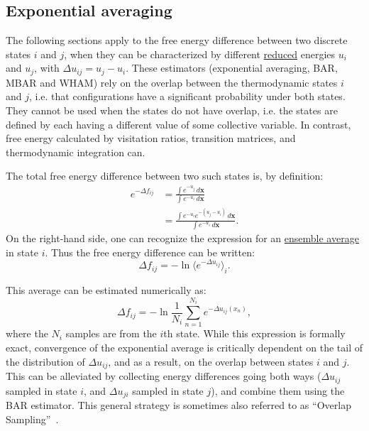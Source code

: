 \documentclass[9pt,review]{livecoms}
\newcommand{\vx}{\mathbf{x}}
\begin{document}
\subsection{Exponential averaging}
\label{sec:fe_estimators:EXP}

The following sections apply to the free energy difference between two discrete states $i$ and $j$, when they can be characterized by different \hyperlink{ref:reduced} {reduced} energies $u_i$ and $u_j$, with $\Delta u_{ij} = u_j - u_i$.
These estimators (exponential averaging, BAR, MBAR and WHAM) rely on the overlap between the thermodynamic states $i$ and $j$, i.e. that configurations have a significant probability under both states. They cannot be used when the states do not have overlap, i.e. the states are defined by each having a different value of some collective variable.  In contrast, free energy calculated by visitation ratios, transition matrices, and thermodynamic integration can.

The total free energy difference between two such states is, by definition:
\begin{align}
    e^{-\Delta f_{ij}} &=  \frac{\int e^{-u_j} \, d\vx}{\int e^{-u_i} \, d\vx}
    \nonumber \\
    &= \frac{\int e^{-u_i}  e^{-(u_j-u_i)} \, d\vx}{\int e^{-u_i} \, d\vx}.
\end{align}
On the right-hand side, one can recognize the expression for an \hyperlink{ref:ensemble_average} {ensemble average} in state $i$.
Thus the free energy difference can be written:
\begin{equation}
    \Delta f_{ij} = -\ln \langle e^{-\Delta u_{ij}}\rangle_i.
\end{equation}

This average can be estimated numerically as:
\begin{equation}
\Delta f_{ij} = -\ln \frac{1}{N_i}\sum_{n=1}^{N_i} e^{-\Delta u_{ij}(x_n)},
\label{eq:expav}
\end{equation}
where the $N_i$ samples are from the $i$th state.
While this expression is formally exact, convergence of the exponential average is critically dependent on the tail of the distribution of $\Delta u_{ij}$, and as a result, on the overlap between states $i$ and $j$.
This can be alleviated by collecting energy differences going both ways ($\Delta u_{ij}$ sampled in state $i$, and $\Delta u_{ji}$ sampled in state $j$), and combine them using the BAR estimator.
This general strategy is sometimes also referred to as ``Overlap Sampling''~\cite{Lu2003}.
\end{document}
